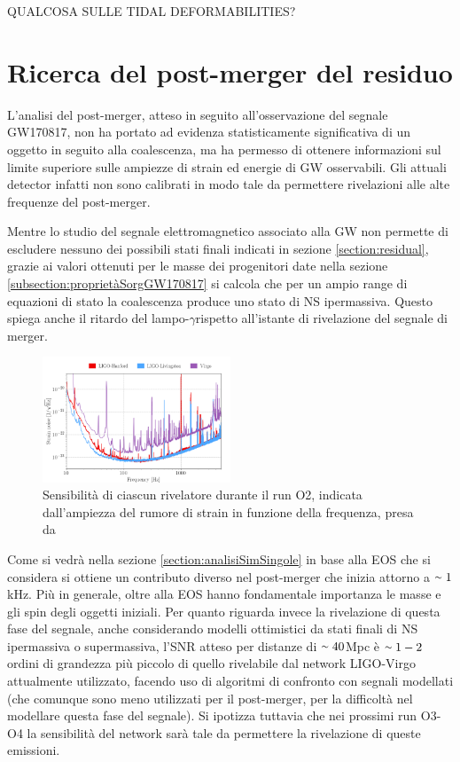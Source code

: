 QUALCOSA SULLE TIDAL DEFORMABILITIES?
\section{Ricerca del post-merger del residuo}
\label{section:postmergerGW170817}
L'analisi del post-merger, atteso in seguito all'osservazione del segnale GW170817, non ha portato ad evidenza statisticamente significativa di un oggetto in seguito alla coalescenza, ma ha permesso di ottenere informazioni sul limite superiore sulle ampiezze di strain ed energie di GW osservabili. Gli attuali detector infatti non sono calibrati in modo tale da permettere rivelazioni alle alte frequenze del post-merger.

Mentre lo studio del segnale elettromagnetico associato alla GW non permette di escludere nessuno dei possibili stati finali indicati in sezione \ref{section:residual}, grazie ai valori ottenuti per le masse dei progenitori date nella sezione \ref{subsection:proprietàSorgGW170817} si calcola che per un ampio range di equazioni di stato la coalescenza produce uno stato di NS ipermassiva. Questo spiega anche il ritardo del lampo-$\gamma$rispetto all'istante di rivelazione del segnale di merger. 

\begin{figure}
	\vspace{-15pt}
	\begin{center}
		\includegraphics[width=0.5\textwidth]{figures/Capitolo_2/noiseData.png}
	\end{center}
	\vspace{-5pt}
	\caption{Sensibilità di ciascun rivelatore durante il run O2, indicata dall'ampiezza del rumore di strain in funzione della frequenza, presa da \cite{Abbott_2019}}
	\label{fig:NoiseFrequenze}
	\vspace{-10pt}
\end{figure}
Come si vedrà nella sezione \ref{section:analisiSimSingole} in base alla EOS che si considera si ottiene un contributo diverso nel post-merger che inizia attorno a $\smallsim1$kHz. Più in generale, oltre alla EOS hanno fondamentale importanza le masse e gli spin degli oggetti iniziali. 
Per quanto riguarda invece la rivelazione di questa fase del segnale, anche considerando modelli ottimistici da stati finali di NS ipermassiva o supermassiva, l'SNR atteso per distanze di $\smallsim40$Mpc è $\smallsim1-2$ ordini di grandezza più piccolo di quello rivelabile dal network LIGO-Virgo attualmente utilizzato, facendo uso di algoritmi di confronto con segnali modellati (che comunque sono meno utilizzati per il post-merger, per la difficoltà nel modellare questa fase del segnale).
Si ipotizza tuttavia che nei prossimi run O3-O4 la sensibilità del network sarà tale da permettere la rivelazione di queste emissioni.

